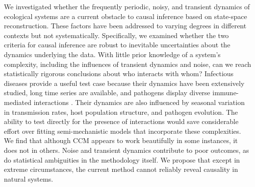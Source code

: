We investigated whether the frequently periodic, noisy, and transient dynamics of ecological systems are a current obstacle to causal inference based on state-space reconstruction.
These factors have been addressed to varying degrees in different contexts \cite{Sugihara2012, Ye2015, Clark2015} but not systematically.
Specifically, we examined whether the two criteria for causal inference are robust to inevitable uncertainties about the dynamics underlying the data.
With little prior knowledge of a system's complexity, including the influences of transient dynamics and noise, can we reach statistically rigorous conclusions about who interacts with whom?
Infectious diseases provide a useful test case because their dynamics have been extensively studied, long time series are available, and pathogens display diverse immune-mediated interactions \cite{Cobey2014}.  
Their dynamics are also influenced by seasonal variation in transmission rates, host population structure, and pathogen evolution.  
The ability to test directly for the presence of interactions would save considerable effort over fitting semi-mechanistic models that incorporate these complexities.
We find that although CCM appears to work beautifully in some instances, it does not in others.
Noise and transient dynamics contribute to poor outcomes, as do statistical ambiguities in the methodology itself.
We propose that except in extreme circumstances, the current method cannot reliably reveal causality in natural systems.
